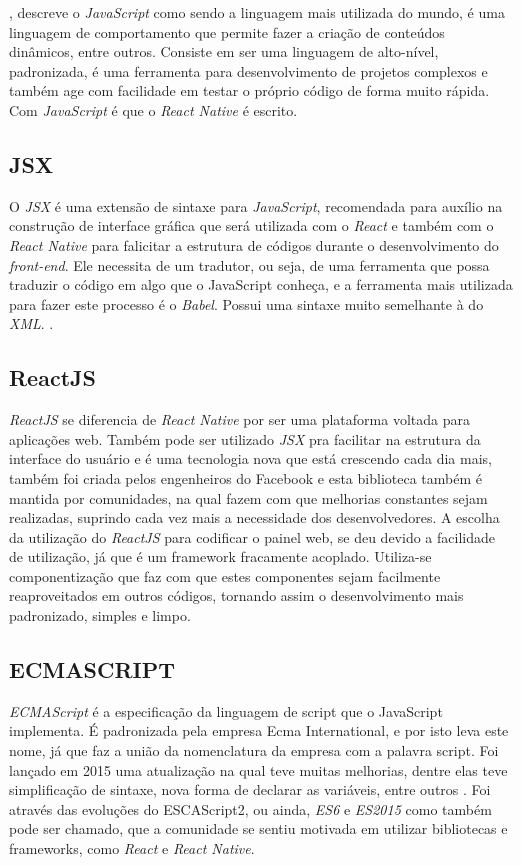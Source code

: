 , descreve o \textit{JavaScript} como sendo a linguagem mais utilizada do mundo, é uma linguagem de comportamento que permite fazer a criação de conteúdos dinâmicos, entre outros. Consiste em ser uma linguagem de alto-nível, padronizada, é uma ferramenta para desenvolvimento de projetos complexos e também age com facilidade em testar o próprio código de forma muito rápida. Com \textit{JavaScript} é que o \textit{React Native} é escrito.


\subsection{JSX}
O \textit{JSX} é uma extensão de sintaxe para \textit{JavaScript}, recomendada para auxílio na construção de interface gráfica que será utilizada com o \textit{React} e também com o \textit{React Native} para falicitar a estrutura de códigos durante o desenvolvimento do \textit{front-end}. Ele necessita de um tradutor, ou seja, de uma ferramenta que possa traduzir o código em algo que o JavaScript conheça, e a ferramenta mais utilizada para fazer este processo é o \textit{Babel}. Possui uma sintaxe muito semelhante à do \textit{XML}.  
\cite{jsx}.


\subsection{ReactJS}
\textit{ReactJS} se diferencia de \textit{React Native} por ser uma plataforma voltada para aplicações web. Também pode ser utilizado \textit{JSX} pra facilitar na estrutura da interface do usuário e é uma tecnologia nova que está crescendo cada dia mais, também foi criada pelos engenheiros do Facebook e esta biblioteca também é mantida por comunidades, na qual fazem com que melhorias constantes sejam realizadas, suprindo cada vez mais a necessidade dos desenvolvedores. A escolha da utilização do \textit{ReactJS} para codificar o painel web, se deu devido a facilidade de utilização, já que é um framework fracamente acoplado. Utiliza-se componentização que faz com que estes componentes sejam facilmente reaproveitados em outros códigos, tornando assim o desenvolvimento mais padronizado, simples e limpo.

\subsection{ECMASCRIPT}

\textit{ECMAScript} é a especificação da linguagem de script que o JavaScript implementa. É padronizada pela empresa Ecma International, e por isto leva este nome, já que faz a união da nomenclatura da empresa com a palavra script. Foi lançado em 2015 uma atualização na qual teve muitas melhorias, dentre elas teve simplificação de sintaxe, nova forma de declarar as variáveis, entre outros \cite{ecma}.
Foi através das evoluções do ESCAScript2, ou ainda, \textit{ES6} e \textit{ES2015} como também pode ser chamado, que a comunidade se sentiu motivada em utilizar bibliotecas e frameworks, como \textit{React} e \textit{React Native}. 

